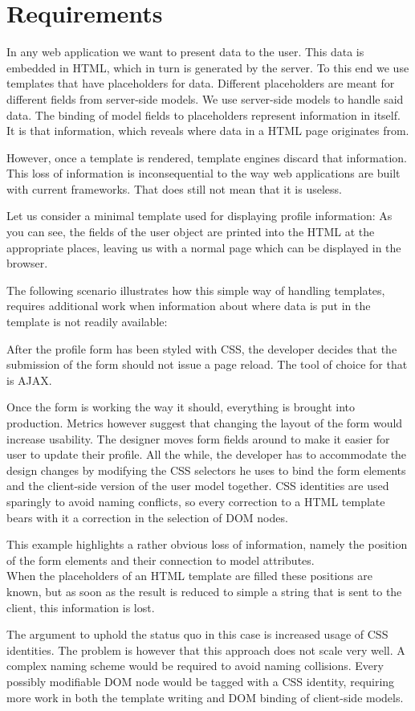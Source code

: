 \documentclass[thesis.tex]{subfiles}
\begin{document}
\chapter{Requirements}
\label{chap:requirements}
In any web application we want to present data to the user.
This data is embedded in HTML, which in turn is generated by the server.
To this end we use templates that have placeholders for data.
Different placeholders are meant for different fields from server-side models.
We use server-side models to handle said data.
The binding of model fields to placeholders represent information in
itself. It is that information, which reveals where data in a HTML page
originates from.

However, once a template is rendered, template engines discard that information.
This loss of information is inconsequential to the way web applications are
built with current frameworks. That does still not mean that it is useless.

Let us consider a minimal template used for displaying profile information:
\todo{\dots}
As you can see, the fields of the user object are printed into the HTML
at the appropriate places, leaving us with a normal page which can be
displayed in the browser.

The following scenario illustrates how this simple way of handling templates,
requires additional work when information about where data is put in the
template is not readily available:

\begin{shaded}
After the profile form has been styled with CSS, the developer decides that
the submission of the form should not issue a page reload. The tool of choice
for that is AJAX.

Once the form is working the way it should, everything is brought into
production. Metrics however suggest that changing the layout of the form would
increase usability.
The designer moves form fields around to make it easier for user to update
their profile.
All the while, the developer has to accommodate the design changes by modifying
the CSS selectors he uses to bind the form elements and the client-side version
of the user model together.
CSS identities are used sparingly to avoid naming conflicts, so every correction
to a HTML template bears with it a correction in the selection of DOM nodes.
\end{shaded}
This example highlights a rather obvious loss of information, namely
the position of the form elements and their connection to model attributes.\\
When the placeholders of an HTML template are filled these positions are known,
but as soon as the result is reduced to simple a string that is sent
to the client, this information is lost.

The argument to uphold the status quo in this case is increased usage of
CSS identities. The problem is however that this approach does not scale very well.
A complex naming scheme would be required to avoid naming collisions.
Every possibly modifiable DOM node would be tagged with a CSS identity,
requiring more work in both the template writing and DOM binding of
client-side models.
\end{document}
